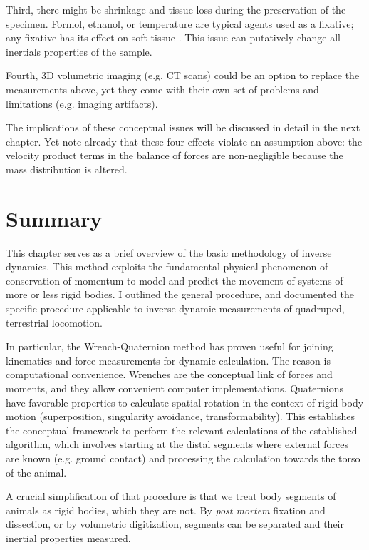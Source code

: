 Third, there might be shrinkage and tissue loss during the preservation of the specimen.
Formol, ethanol, or temperature are typical agents used as a fixative; any fixative has its effect on soft tissue \citep{Buytaert2014,Pech1987}.
This issue can putatively change all inertials properties of the sample.

Fourth, 3D volumetric imaging (e.g. CT scans) could be an option to replace the measurements above, yet they come with their own set of problems and limitations (e.g. imaging artifacts).


The implications of these conceptual issues will be discussed in detail in the next chapter.
Yet note already that these four effects violate an assumption above: the velocity product terms in the balance of forces are non-negligible because the mass distribution is altered.


\clearpage
\section{Summary}
\label{sec:orge433fd6}
This chapter serves as a brief overview of the basic methodology of inverse dynamics.
This method exploits the fundamental physical phenomenon of conservation of momentum to model and predict the movement of systems of more or less rigid bodies.
I outlined the general procedure, and documented the specific procedure applicable to inverse dynamic measurements of quadruped, terrestrial locomotion.


In particular, the Wrench-Quaternion method \citep{Dumas2004} has proven useful for joining kinematics and force measurements for dynamic calculation.
The reason is computational convenience.
Wrenches are the conceptual link of forces and moments, and they allow convenient computer implementations.
Quaternions have favorable properties to calculate spatial rotation in the context of rigid body motion (superposition, singularity avoidance, transformability).
This establishes the conceptual framework to perform the relevant calculations of the established algorithm, which involves starting at the distal segments where external forces are known (e.g. ground contact) and processing the calculation towards the torso of the animal.


A crucial simplification of that procedure is that we treat body segments of animals as rigid bodies, which they are not.
By \emph{post mortem} fixation and dissection, or by volumetric digitization, segments can be separated and their inertial properties measured.
